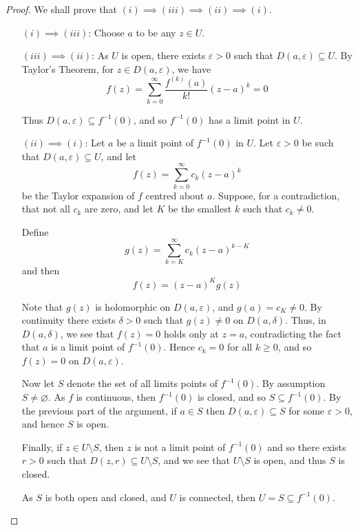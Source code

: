 \documentclass[10pt,fleqn]{article}
\newcommand{\eps}{\varepsilon}
\theoremstyle{definition} \newtheorem{defn}{Definition}[section]
\theoremstyle{plain}      \newtheorem{thm}[defn]{Theorem}
\theoremstyle{definition} \newtheorem{prop}[defn]{Proposition}
\theoremstyle{plain}      \newtheorem{lem}[defn]{Lemma}
\theoremstyle{definition} \newtheorem{cor}[defn]{Corollary}
\theoremstyle{definition} \newtheorem{ex}[defn]{Example}
\theoremstyle{definition} \newtheorem{rem}[defn]{Remark}
\begin{document}
\begin{proof}
    We shall prove that $(i)\implies(iii)\implies(ii)\implies(i)$.

    \begin{enumerate}
        \item[$(i)\implies(iii)$:]
        Choose $a$ to be any $z\in U$.
        \item[$(iii)\implies(ii)$:]
        As $U$ is open, there exists $\eps>0$ such that $D(a,\eps)\subseteq U$.
        By Taylor's Theorem, for $z\in D(a,\eps)$, we have
        \[
            f(z)=
            \sum_{k=0}^{\infty}\frac{f^{(k)}(a)}{k!}(z-a)^k=
            0
        \]

        Thus $D(a,\eps)\subseteq f^{-1}(0)$, and so $f^{-1}(0)$ has a limit point in $U$.
        \item[$(ii)\implies(i)$:]
        Let $a$ be a limit point of $f^{-1}(0)$ in $U$.
        Let $\eps>0$ be such that $D(a,\eps)\subseteq U$, and let
        \[
            f(z)=
            \sum_{k=0}^{\infty}c_k(z-a)^k
        \]
        be the Taylor expansion of $f$ centred about $a$.
        Suppose, for a contradiction, that not all $c_k$ are zero, and let $K$ be the smallest $k$ such that $c_k\neq0$.

        Define
        \[
            g(z)=
            \sum_{k=K}^{\infty}c_k(z-a)^{k-K}
        \]
        and then
        \[
            f(z)=
            (z-a)^Kg(z)
        \]

        Note that $g(z)$ is holomorphic on $D(a,\eps)$, and $g(a)=c_K\neq0$.
        By continuity there exists $\delta>0$ such that $g(z)\neq0$ on $D(a,\delta)$.
        Thus, in $D(a,\delta)$, we see that $f(z)=0$ holds only at $z=a$, contradicting the fact that $a$ is a limit point of $f^{-1}(0)$.
        Hence $c_k=0$ for all $k\geq0$, and so $f(z)=0$ on $D(a,\eps)$.

        Now let $S$ denote the set of all limits points of $f^{-1}(0)$.
        By assumption $S\neq\varnothing$.
        As $f$ is continuous, then $f^{-1}(0)$ is closed, and so $S\subseteq f^{-1}(0)$.
        By the previous part of the argument, if $a\in S$ then $D(a,\eps)\subseteq S$ for some $\eps>0$, and hence $S$ is open.

        Finally, if $z\in U\setminus S$, then $z$ is not a limit point of $f^{-1}(0)$ and so there exists $r>0$ such that $D(z,r)\subseteq U\setminus S$, and we see that $U\setminus S$ is open, and thus $S$ is closed.

        As $S$ is both open and closed, and $U$ is connected, then $U=S\subseteq f^{-1}(0)$.
    \end{enumerate}
\end{proof}
\end{document}
